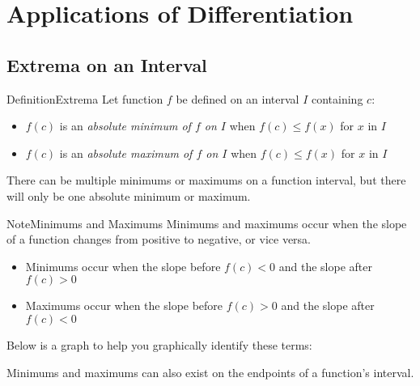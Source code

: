 \documentclass{MathNotes}
\newenvironment{definition}[1]{\begin{RedBox}{Definition}{#1}}{\end{RedBox}}
\newenvironment{note}[1]{\begin{YellowBox}{Note}{#1}}{\end{YellowBox}}
\begin{document}
\section{Applications of Differentiation}
\subsection{Extrema on an Interval}
\begin{definition}{Extrema}
	Let function $f$ be defined on an interval $I$ containing $c$:
	\begin{itemize}
		\item $f(c)$ is an \textit{absolute minimum of $f$ on $I$} when $f(c)\leq f(x)$
		      for $x$ in $I$
		\item $f(c)$ is an \textit{absolute maximum of $f$ on $I$} when $f(c)\leq f(x)$
		      for $x$ in $I$
	\end{itemize}

	There can be multiple minimums or maximums on a function interval, but
	there will only be one absolute minimum or maximum.
\end{definition}

\begin{note}{Minimums and Maximums}
	Minimums and maximums occur when the slope of a function changes
	from positive to negative, or vice versa.
	\begin{itemize}
		\item Minimums occur when the slope before $f(c)<0$ and the slope after
		      $f(c)>0$
		\item Maximums occur when the slope before $f(c)>0$ and the slope after
		      $f(c)<0$
	\end{itemize}
\end{note}

Below is a graph to help you graphically identify these terms:
\begin{center}
	
\end{center}

Minimums and maximums can also exist on the endpoints of a function's
interval.
\end{document}
